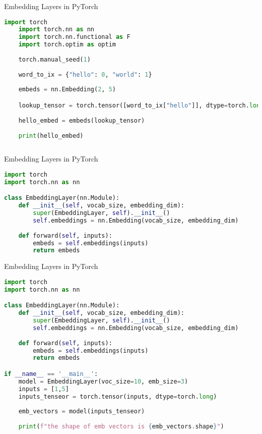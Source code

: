  \begin{frame}[fragile]{Embedding Layers in PyTorch}
    \tiny
     \begin{lstlisting}[language=Python]
    import torch
    import torch.nn as nn
    import torch.nn.functional as F
    import torch.optim as optim
    
    torch.manual_seed(1)
    
    word_to_ix = {"hello": 0, "world": 1}
    
    embeds = nn.Embedding(2, 5) 

    lookup_tensor = torch.tensor([word_to_ix["hello"]], dtype=torch.long)
    
    hello_embed = embeds(lookup_tensor)
    
    print(hello_embed)
    
    \end{lstlisting}

 \end{frame}
 
 \begin{frame}[fragile]{Embedding Layers in PyTorch}
  \tiny
     \begin{lstlisting}[language=Python]
import torch
import torch.nn as nn

class EmbeddingLayer(nn.Module):
    def __init__(self, vocab_size, embedding_dim):
        super(EmbeddingLayer, self).__init__()
        self.embeddings = nn.Embedding(vocab_size, embedding_dim)
    
    def forward(self, inputs):
        embeds = self.embeddings(inputs)
        return embeds
\end{lstlisting}        

 \end{frame}
 
 \begin{frame}[fragile]{Embedding Layers in PyTorch}
  \tiny
     \begin{lstlisting}[language=Python]
import torch
import torch.nn as nn

class EmbeddingLayer(nn.Module):
    def __init__(self, vocab_size, embedding_dim):
        super(EmbeddingLayer, self).__init__()
        self.embeddings = nn.Embedding(vocab_size, embedding_dim)
    
    def forward(self, inputs):
        embeds = self.embeddings(inputs)
        return embeds

if __name__ == '__main__':
    model = EmbeddingLayer(voc_size=10, emb_size=3)
    inputs = [1,5]
    inputs_tenseor = torch.tensor(inputs, dtype=torch.long)
    
    emb_vectors = model(inputs_tenseor)
    
    print(f"the shape of emb vectors is {emb_vectors.shape}")            
\end{lstlisting}
 \end{frame}

